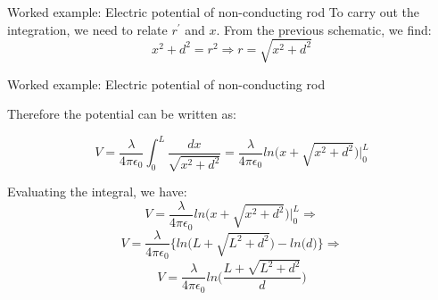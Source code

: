 {\begin{frame}{Worked example: Electric potential of non-conducting rod}
To carry out the integration, we need to relate $r^\prime$ and $x$.
From the previous schematic, we find:
\begin{equation*}
    x^2 + d^2 = r^2 \Rightarrow r = \sqrt{x^2 + d^2}
\end{equation*}

\end{frame}

%
%
%

\begin{frame}{Worked example: Electric potential of non-conducting rod}

Therefore the potential can be written as:

\begin{equation*}
    V = \frac{\lambda}{4\pi\epsilon_0} \int_{0}^{L} \frac{dx}{\sqrt{x^2 + d^2}} =
        \frac{\lambda}{4\pi\epsilon_0} ln\Big(x + \sqrt{x^2+d^2}\Big)\Bigg\rvert_{0}^{L}
\end{equation*}

Evaluating the integral, we have:
\begin{equation*}
    V = \frac{\lambda}{4\pi\epsilon_0} ln\Big(x + \sqrt{x^2+d^2}\Big)\Bigg\rvert_{0}^{L} \Rightarrow
\end{equation*}
\begin{equation*}
    V = \frac{\lambda}{4\pi\epsilon_0} \Bigg\{ ln\Big(L + \sqrt{L^2+d^2}\Big) - ln\Big(d\Big) \Bigg\} \Rightarrow
\end{equation*}
\begin{equation*}
    V = \frac{\lambda}{4\pi\epsilon_0} ln\Big(\frac{L + \sqrt{L^2+d^2}}{d}\Big)
\end{equation*}


\end{frame}


} %



%
%
%


